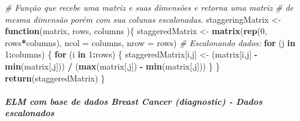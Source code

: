 \documentclass[
]{article}
\newenvironment{Shaded}{\begin{snugshade}}{\end{snugshade}}
\newcommand{\CommentTok}[1]{\textcolor[rgb]{0.56,0.35,0.01}{\textit{#1}}}
\newcommand{\ControlFlowTok}[1]{\textcolor[rgb]{0.13,0.29,0.53}{\textbf{#1}}}
\newcommand{\DataTypeTok}[1]{\textcolor[rgb]{0.13,0.29,0.53}{#1}}
\newcommand{\DecValTok}[1]{\textcolor[rgb]{0.00,0.00,0.81}{#1}}
\newcommand{\KeywordTok}[1]{\textcolor[rgb]{0.13,0.29,0.53}{\textbf{#1}}}
\newcommand{\NormalTok}[1]{#1}
\newcommand{\OperatorTok}[1]{\textcolor[rgb]{0.81,0.36,0.00}{\textbf{#1}}}
\newcommand{\StringTok}[1]{\textcolor[rgb]{0.31,0.60,0.02}{#1}}
\begin{document}
\begin{Shaded}
\begin{Highlighting}[]
\CommentTok{# Função que recebe uma matriz e suas dimensões e retorna uma matriz}
\CommentTok{# de mesma dimensão porém com sua colunas escalonadas.}
\NormalTok{staggeringMatrix <-}\StringTok{ }\ControlFlowTok{function}\NormalTok{(matrix, rows, columns )\{}
\NormalTok{  staggeredMatrix <-}\StringTok{ }\KeywordTok{matrix}\NormalTok{(}\KeywordTok{rep}\NormalTok{(}\DecValTok{0}\NormalTok{, rows}\OperatorTok{*}\NormalTok{columns), }\DataTypeTok{ncol =}\NormalTok{ columns, }\DataTypeTok{nrow =}\NormalTok{ rows)}
  \CommentTok{# Escalonando dados:}
  \ControlFlowTok{for}\NormalTok{ (j }\ControlFlowTok{in} \DecValTok{1}\OperatorTok{:}\NormalTok{columns) \{}
    \ControlFlowTok{for}\NormalTok{ (i }\ControlFlowTok{in} \DecValTok{1}\OperatorTok{:}\NormalTok{rows) \{}
\NormalTok{      staggeredMatrix[i,j] <-}\StringTok{ }\NormalTok{(matrix[i,j] }\OperatorTok{-}\StringTok{ }\KeywordTok{min}\NormalTok{(matrix[,j])) }\OperatorTok{/}\StringTok{ }\NormalTok{(}\KeywordTok{max}\NormalTok{(matrix[,j]) }\OperatorTok{-}\StringTok{ }\KeywordTok{min}\NormalTok{(matrix[,j]))}
\NormalTok{    \}}
\NormalTok{  \}}
  \KeywordTok{return}\NormalTok{(staggeredMatrix)}
\NormalTok{\}}
\end{Highlighting}
\end{Shaded}

\hypertarget{elm-com-base-de-dados-breast-cancer-diagnostic---dados-escalonados}{%
\paragraph{\texorpdfstring{\textbf{\emph{ELM com base de dados Breast
Cancer (diagnostic) - Dados
escalonados}}}{ELM com base de dados Breast Cancer (diagnostic) - Dados escalonados}}\label{elm-com-base-de-dados-breast-cancer-diagnostic---dados-escalonados}}
\end{document}
